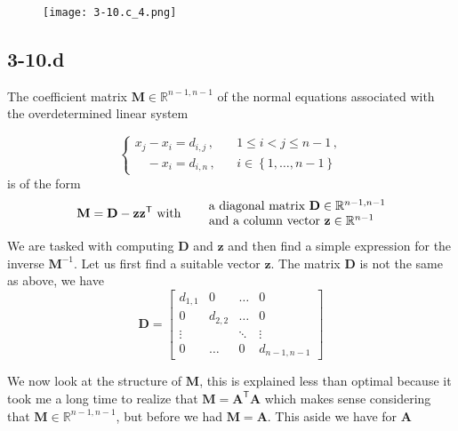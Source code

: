 \documentclass{article}
\begin{document}
\begin{figure}[!hbt]
    \centering
\texttt{[image: 3-10.c\_4.png]}
\end{figure}

\subsection*{3-10.d}
The coefficient matrix $\mathbf{M} \in \mathbb{R}^{n-1, n-1}$ of the normal equations associated with the overdetermined linear system 

\begin{equation*}
    \begin{cases}
    x_{j}-x_{i} = d_{i,j}\,,\quad &1 \leq i < j \leq n - 1\,,\\
    \phantom{x_{j}}-x_{i} = d_{i,n}\,,&i\in\left\{1, \dots, n-1\right\}
    \end{cases}
\end{equation*}
is of the form 
\begin{equation*}
    \mathbf{M} = \mathbf{D} - \mathbf{z}\mathbf{z}^{\mathsf{T}} \text{ with } \quad \begin{matrix} \hspace{9px}\text{a diagonal matrix } \mathbf{D} \in \mathbb{R}^{n-1,n-1} \\
    \text{and a column vector } \mathbf{z} \in \mathbb{R}^{n-1}
    \end{matrix}
\end{equation*}
We are tasked with computing $\mathbf{D}$ and $\mathbf{z}$ and then find a simple expression for the inverse $\mathbf{M}^{-1}$. Let us first find a suitable vector $\mathbf{z}$. The matrix $\mathbf{D}$ is not the same as above, we have
\begin{equation*}
    \mathbf{D} = 
    \begin{bmatrix}
        d_{1,1} & 0 & \dots & 0\\
        0  & d_{2,2} & \dots & 0 \\
        \vdots & & \ddots  & \vdots \\
        0  & \dots& 0 & d_{n-1,n-1} 
    \end{bmatrix}
\end{equation*}

\pagebreak

\noindent We now look at the structure of $\mathbf{M}$, this is explained less than optimal because it took me a long time to realize that $\mathbf{M} = \mathbf{A}^{\mathsf{T}}\mathbf{A}$ which makes sense considering that $\mathbf{M} \in \mathbb{R}^{n-1, n-1}$, but before we had $\mathbf{M} = \mathbf{A}$. This aside we have for $\mathbf{A}$
\end{document}
